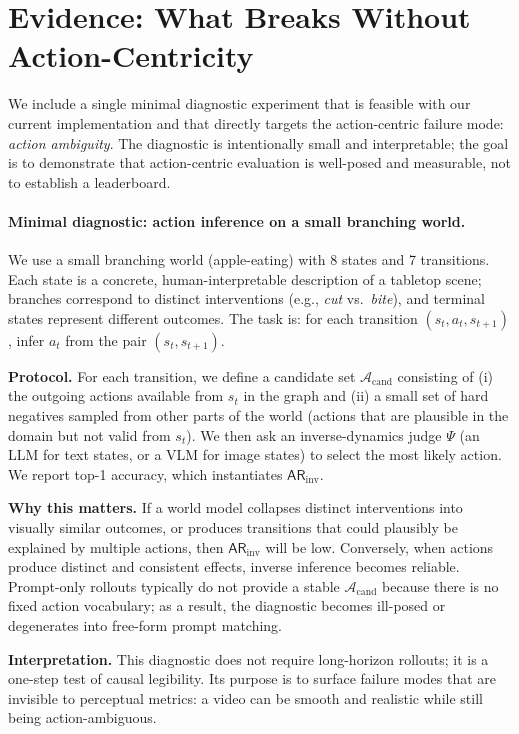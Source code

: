 \documentclass{article}
\theoremstyle{plain}
\theoremstyle{definition}
\theoremstyle{remark}
\begin{document}
\section{Evidence: What Breaks Without Action-Centricity}
\label{sec:evidence}
We include a single minimal diagnostic experiment that is feasible with our current implementation and that directly targets the action-centric failure mode: \emph{action ambiguity}. The diagnostic is intentionally small and interpretable; the goal is to demonstrate that action-centric evaluation is well-posed and measurable, not to establish a leaderboard.

\paragraph{Minimal diagnostic: action inference on a small branching world.}
We use a small branching world (apple-eating) with 8 states and 7 transitions. Each state is a concrete, human-interpretable description of a tabletop scene; branches correspond to distinct interventions (e.g., \emph{cut} vs.\ \emph{bite}), and terminal states represent different outcomes. The task is: for each transition $(s_t,a_t,s_{t+1})$, infer $a_t$ from the pair $(s_t,s_{t+1})$.

\textbf{Protocol.} For each transition, we define a candidate set $\mathcal{A}_{\text{cand}}$ consisting of (i) the outgoing actions available from $s_t$ in the graph and (ii) a small set of hard negatives sampled from other parts of the world (actions that are plausible in the domain but not valid from $s_t$). We then ask an inverse-dynamics judge $\Psi$ (an LLM for text states, or a VLM for image states) to select the most likely action. We report top-1 accuracy, which instantiates $\mathsf{AR}_{\text{inv}}$.

\textbf{Why this matters.} If a world model collapses distinct interventions into visually similar outcomes, or produces transitions that could plausibly be explained by multiple actions, then $\mathsf{AR}_{\text{inv}}$ will be low. Conversely, when actions produce distinct and consistent effects, inverse inference becomes reliable. Prompt-only rollouts typically do not provide a stable $\mathcal{A}_{\text{cand}}$ because there is no fixed action vocabulary; as a result, the diagnostic becomes ill-posed or degenerates into free-form prompt matching.

\textbf{Interpretation.} This diagnostic does not require long-horizon rollouts; it is a one-step test of causal legibility. Its purpose is to surface failure modes that are invisible to perceptual metrics: a video can be smooth and realistic while still being action-ambiguous.
\end{document}
